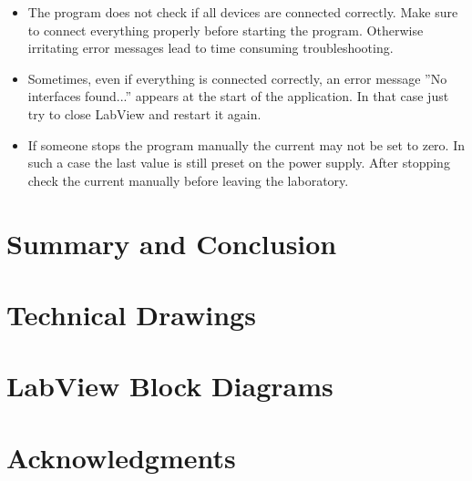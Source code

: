 \documentclass[parskip,12pt,headsepline,a4paper] {scrbook}
\begin{document}
\begin{itemize}
\item The program does not check if all devices are connected correctly. Make sure to connect everything properly before starting the program. Otherwise irritating error messages lead to time consuming troubleshooting.
\item Sometimes, even if everything is connected correctly, an error message ''No interfaces found...'' appears at the start of the application. In that case just try to close LabView and restart it again.
\item If someone stops the program manually the current may not be set to zero. In such a case the last value is still preset on the power supply. After stopping check the current manually before leaving the laboratory.
\end{itemize}

\chapter{Summary and Conclusion}

\newpage

\appendix
\chapter{Technical Drawings}

\chapter{LabView Block Diagrams}


\newpage
{} \label{listoffig}
\listoffigures

\newpage
{} \label{listoftab}
\listoftables

\newpage
{} \label{bibliography}





\newpage
{} \label{acknow}
\chapter*{Acknowledgments}
\end{document}
